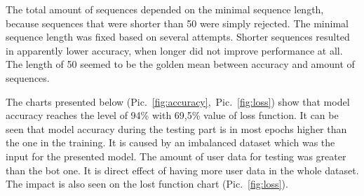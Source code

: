 The total amount of sequences depended on the minimal sequence length, because sequences that were shorter than 50 were simply rejected. The minimal sequence length was fixed based on several attempts. Shorter sequences resulted in apparently lower accuracy, when longer did not improve performance at all. The length of 50 seemed to be the golden mean between accuracy and amount of sequences.\par

The charts presented below \mbox{(Pic. \ref{fig:accuracy}, Pic. \ref{fig:loss})} show that model accuracy reaches the level of 94\% with 69,5\% value of loss function. It can be seen that model accuracy during the testing part is in most epochs higher than the one in the training. It is caused by an imbalanced dataset which was the input for the presented model. The amount of user data for testing was greater than the bot one. It is direct effect of having more user data in the whole dataset. The impact is also seen on the lost function chart \mbox{(Pic. \ref{fig:loss})}.\par

